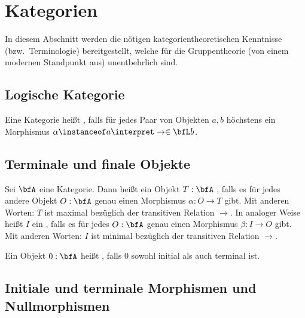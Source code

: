 \section{Kategorien}

In diesem Abschnitt werden die nötigen kategorientheoretischen Kenntnisse (bzw.~Terminologie) bereitgestellt, welche für die
Gruppentheorie (von einem modernen Standpunkt aus) unentbehrlich sind.

\subsection{Logische Kategorie}

\begin{definition}
    Eine Kategorie heißt , falls für jedes Paar von
    Objekten $a,b$ höchstens ein Morphismus $\alpha\instanceof a\interpret\to\in \bfL b$. 
\end{definition}



\subsection{Terminale und finale Objekte}

\begin{definition}
    Sei $\bfA$ eine Kategorie. Dann heißt ein Objekt $T:\bfA$ , falls es für jedes andere Objekt $O:\bfA$ genau
    einen Morphismus $\alpha:O\to T$ gibt. Mit anderen Worten: $T$ ist maximal bezüglich der transitiven Relation $\to$.
    In analoger Weise heißt $I$ ein , falls es für jedes $O:\bfA$
    genau einen Morphismus $\beta:I\to O$ gibt. Mit anderen Worten: $I$ ist minimal bezüglich der transitiven Relation $\to$. 
\end{definition}

\begin{definition}[Nullobjekt]
    Ein Objekt $0:\bfA$ heißt , falls $0$ sowohl initial als auch terminal ist.
\end{definition}

\subsection{Initiale und terminale Morphismen und Nullmorphismen}

